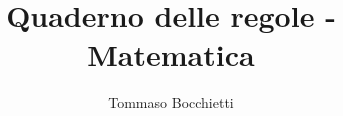 \documentclass{article}
\title{Quaderno delle regole - Matematica}
\author{Tommaso Bocchietti}
\begin{document}
\maketitle
\tableofcontents

\pagebreak


\pagebreak





\pagebreak






\pagebreak








\end{document}
